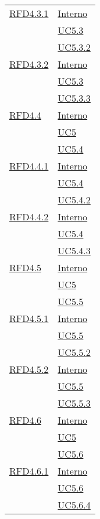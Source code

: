 \begin{longtable}{|>{\centering}m{5cm}|m{5cm}<{\centering}|}
\hyperlink{RFD4.3.1}{RFD4.3.1} & \hyperlink{Interno}{Interno}\\
& \hyperref[UC5.3]{UC5.3}\\
& \hyperref[UC5.3.2]{UC5.3.2}\\ \hline

\hyperlink{RFD4.3.2}{RFD4.3.2} & \hyperlink{Interno}{Interno}\\
& \hyperref[UC5.3]{UC5.3}\\
& \hyperref[UC5.3.3]{UC5.3.3}\\ \hline

\hyperlink{RFD4.4}{RFD4.4} & \hyperlink{Interno}{Interno}\\
& \hyperref[UC5]{UC5}\\
& \hyperref[UC5.4]{UC5.4}\\ \hline

\hyperlink{RFD4.4.1}{RFD4.4.1} & \hyperlink{Interno}{Interno}\\
& \hyperref[UC5.4]{UC5.4}\\
& \hyperref[UC5.4.2]{UC5.4.2}\\ \hline

\hyperlink{RFD4.4.2}{RFD4.4.2} & \hyperlink{Interno}{Interno}\\
& \hyperref[UC5.4]{UC5.4}\\
& \hyperref[UC5.4.3]{UC5.4.3}\\ \hline

\hyperlink{RFD4.5}{RFD4.5} & \hyperlink{Interno}{Interno}\\
& \hyperref[UC5]{UC5}\\
& \hyperref[UC5.5]{UC5.5}\\ \hline

\hyperlink{RFD4.5.1}{RFD4.5.1} & \hyperlink{Interno}{Interno}\\
& \hyperref[UC5.5]{UC5.5}\\
& \hyperref[UC5.5.2]{UC5.5.2}\\ \hline

\hyperlink{RFD4.5.2}{RFD4.5.2} & \hyperlink{Interno}{Interno}\\
& \hyperref[UC5.5]{UC5.5}\\
& \hyperref[UC5.5.3]{UC5.5.3}\\ \hline

\hyperlink{RFD4.6}{RFD4.6} & \hyperlink{Interno}{Interno}\\
& \hyperref[UC5]{UC5}\\
& \hyperref[UC5.6]{UC5.6}\\ \hline

\hyperlink{RFD4.6.1}{RFD4.6.1} & \hyperlink{Interno}{Interno}\\
& \hyperref[UC5.6]{UC5.6}\\
& \hyperref[UC5.6.4]{UC5.6.4}\\ \hline


\end{longtable}
